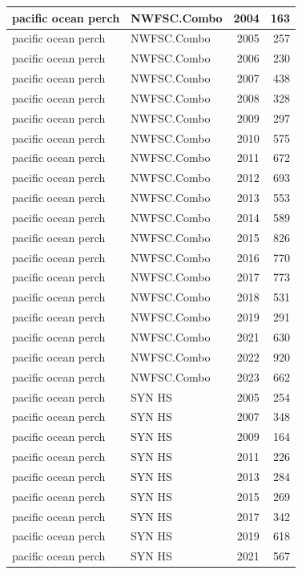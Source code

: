 \documentclass[
  letterpaper,
  DIV=11,
  numbers=noendperiod]{scrartcl}
\begin{document}
\begin{tabular}[t]{l|l|r|r}
\hline
pacific ocean perch & NWFSC.Combo & 2004 & 163\\
\hline
pacific ocean perch & NWFSC.Combo & 2005 & 257\\
\hline
pacific ocean perch & NWFSC.Combo & 2006 & 230\\
\hline
pacific ocean perch & NWFSC.Combo & 2007 & 438\\
\hline
pacific ocean perch & NWFSC.Combo & 2008 & 328\\
\hline
pacific ocean perch & NWFSC.Combo & 2009 & 297\\
\hline
pacific ocean perch & NWFSC.Combo & 2010 & 575\\
\hline
pacific ocean perch & NWFSC.Combo & 2011 & 672\\
\hline
pacific ocean perch & NWFSC.Combo & 2012 & 693\\
\hline
pacific ocean perch & NWFSC.Combo & 2013 & 553\\
\hline
pacific ocean perch & NWFSC.Combo & 2014 & 589\\
\hline
pacific ocean perch & NWFSC.Combo & 2015 & 826\\
\hline
pacific ocean perch & NWFSC.Combo & 2016 & 770\\
\hline
pacific ocean perch & NWFSC.Combo & 2017 & 773\\
\hline
pacific ocean perch & NWFSC.Combo & 2018 & 531\\
\hline
pacific ocean perch & NWFSC.Combo & 2019 & 291\\
\hline
pacific ocean perch & NWFSC.Combo & 2021 & 630\\
\hline
pacific ocean perch & NWFSC.Combo & 2022 & 920\\
\hline
pacific ocean perch & NWFSC.Combo & 2023 & 662\\
\hline
pacific ocean perch & SYN HS & 2005 & 254\\
\hline
pacific ocean perch & SYN HS & 2007 & 348\\
\hline
pacific ocean perch & SYN HS & 2009 & 164\\
\hline
pacific ocean perch & SYN HS & 2011 & 226\\
\hline
pacific ocean perch & SYN HS & 2013 & 284\\
\hline
pacific ocean perch & SYN HS & 2015 & 269\\
\hline
pacific ocean perch & SYN HS & 2017 & 342\\
\hline
pacific ocean perch & SYN HS & 2019 & 618\\
\hline
pacific ocean perch & SYN HS & 2021 & 567\\

\end{tabular}
\end{document}
